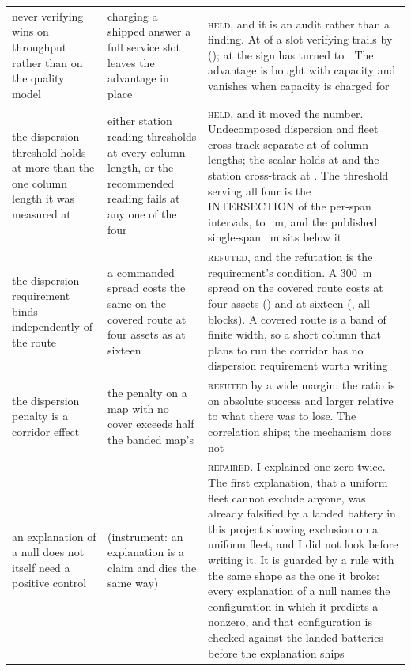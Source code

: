 \begin{tabular}{@{}p{}p{}p{}@{}}
never verifying wins on throughput rather than on the quality model & charging a shipped answer a full service slot leaves the advantage in place & \textsc{held}, and it is an audit rather than a finding. At \DrComplyLo{} of a slot verifying trails by \DrComplyQuarter{} (\DrComplyQuarterV{}); at \DrComplyHi{} the sign has turned to \DrComplyFull{}. The advantage is bought with capacity and vanishes when capacity is charged for \\
the dispersion threshold holds at more than the one column length it was measured at & either station reading thresholds at every column length, or the recommended reading fails at any one of the four & \textsc{held}, and it moved the number. Undecomposed dispersion and fleet cross-track separate at \DkSpreadHeld{} of \DkSpreadSpans{} column lengths; the scalar holds at \DkScalarHeld{} and the station cross-track at \DkCrossHeld{}. The threshold serving all four is the INTERSECTION of the per-span intervals, \DkSpreadLo{} to \DkSpreadHi{}~m, and the published single-span \DsSpreadThresh{}~m sits below it \\
the dispersion requirement binds independently of the route & a commanded spread costs the same on the covered route at four assets as at sixteen & \textsc{refuted}, and the refutation is the requirement's condition. A 300~m spread on the covered route costs \DkCostFour{} at four assets (\DkCostFourV{}) and \DkCostSix{} at sixteen (\DkCostSixV{}, all \DkBlocks{} blocks). A covered route is a band of finite width, so a short column that plans to run the corridor has no dispersion requirement worth writing \\
the dispersion penalty is a corridor effect & the penalty on a map with no cover exceeds half the banded map's & \textsc{refuted} by a wide margin: the ratio is \DcWideRatio{} on absolute success and larger relative to what there was to lose. The correlation ships; the mechanism does not \\
an explanation of a null does not itself need a positive control & (instrument: an explanation is a claim and dies the same way) & \textsc{repaired}. I explained one zero twice. The first explanation, that a uniform fleet cannot exclude anyone, was already falsified by a landed battery in this project showing \FmBandFifo{} exclusion on a uniform fleet, and I did not look before writing it. It is guarded by a rule with the same shape as the one it broke: every explanation of a null names the configuration in which it predicts a nonzero, and that configuration is checked against the landed batteries before the explanation ships \\

\end{tabular}
